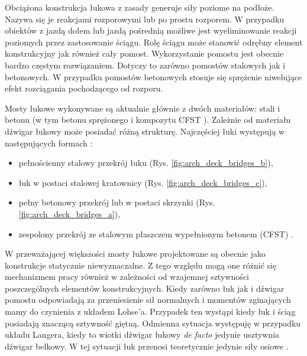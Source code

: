 Obciążona konstrukcja łukowa z zasady generuje siły poziome na podłoże. Nazywa się je reakcjami rozporowymi lub po prostu rozporem. W przypadku obiektów z jazdą dołem lub jazdą pośrednią możliwe jest wyeliminowanie reakcji poziomych przez zastosowanie ściągu. Rolę ściągu może stanowić odrębny element konstrukcyjny jak również cały pomost. Wykorzystanie pomostu jest obecnie bardzo częstym rozwiązaniem. Dotyczy to zarówno pomostów stalowych jak i betonowych. W przypadku pomostów betonowych stosuje się sprężenie niwelujące efekt rozciągania pochodzącego od rozporu.

Mosty łukowe wykonywane są aktualnie głównie z dwóch materiałów: stali i betonu (w tym betonu sprężonego i kompozytu CFST ). Zależnie od materiału dźwigar łukowy może posiadać różną strukturę. Najczęściej łuki występują w następujących formach \parencite{Cholewo1965}:
\begin{itemize}
	\item pełnościenny stalowy przekrój łuku (Rys. \ref{fig:arch_deck_bridges_b}),
	\item łuk w postaci stalowej kratownicy (Rys. \ref{fig:arch_deck_bridges_c}),
	\item pełny betonowy przekrój lub w postaci skrzynki (Rys. \ref{fig:arch_deck_bridges_a}),
	\item zespolony przekrój ze stalowym płaszczem wypełnionym betonem (CFST) \parencite{Abramski2019}.
\end{itemize}

W przeważającej większości mosty łukowe projektowane są obecnie jako konstrukcje statycznie niewyznaczalne. Z tego względu mogą one różnić się mechanizmem pracy również w zależności od wzajemnej sztywności poszczególnych elementów konstrukcyjnych.  Kiedy zarówno łuk jak i dźwigar pomostu odpowiadają za przeniesienie sił normalnych i momentów zginających mamy do czynienia z układem Lohse'a. Przypadek ten wystąpi kiedy łuk i ściąg posiadają znaczącą sztywność giętną. Odmienna sytuacja występuję w przypadku układu Langera, kiedy to wiotki dźwigar łukowy \textit{de facto} jedynie usztywnia dźwigar belkowy. W tej sytuacji łuk przenosi teoretycznie jedynie siły osiowe \parencite{Lin2017}. 

